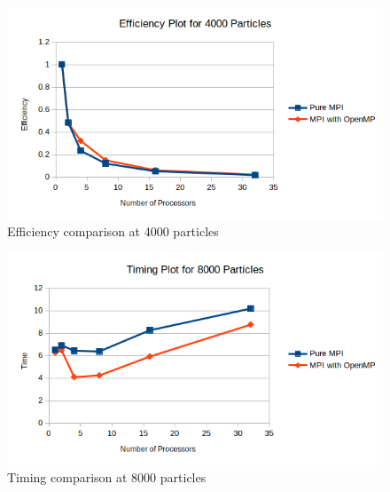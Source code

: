 \documentclass{article}
\begin{document}
\begin{figure}[H]
	\begin{center}
		\hspace*{-0.5cm}                                                           
  		\includegraphics[scale=0.7]{Report_Assets/efficiency4000.png}
  	\end{center}
  	\caption{Efficiency comparison at 4000 particles}
\end{figure}

\begin{figure}[H]
	\begin{center}
		\hspace*{-0.5cm}                                                           
  		\includegraphics[scale=0.7]{Report_Assets/timing8000.png}
  	\end{center}
  	\caption{Timing comparison at 8000 particles}
\end{figure}
\end{document}
